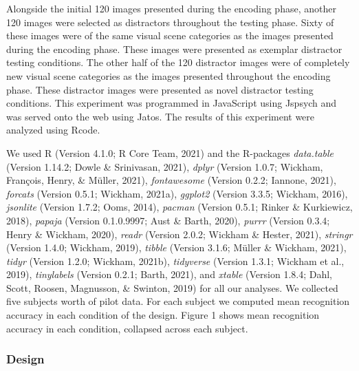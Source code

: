 \documentclass[
  man,floatsintext]{apa6}
\begin{document}
Alongside the initial 120 images presented during the encoding phase, another 120 images were selected as distractors throughout the testing phase. Sixty of these images were of the same visual scene categories as the images presented during the encoding phase. These images were presented as exemplar distractor testing conditions. The other half of the 120 distractor images were of completely new visual scene categories as the images presented throughout the encoding phase. These distractor images were presented as novel distractor testing conditions. This experiment was programmed in JavaScript using Jspsych and was served onto the web using Jatos. The results of this experiment were analyzed using Rcode.

We used R (Version 4.1.0; R Core Team, 2021) and the R-packages \emph{data.table} (Version 1.14.2; Dowle \& Srinivasan, 2021), \emph{dplyr} (Version 1.0.7; Wickham, François, Henry, \& Müller, 2021), \emph{fontawesome} (Version 0.2.2; Iannone, 2021), \emph{forcats} (Version 0.5.1; Wickham, 2021a), \emph{ggplot2} (Version 3.3.5; Wickham, 2016), \emph{jsonlite} (Version 1.7.2; Ooms, 2014), \emph{pacman} (Version 0.5.1; Rinker \& Kurkiewicz, 2018), \emph{papaja} (Version 0.1.0.9997; Aust \& Barth, 2020), \emph{purrr} (Version 0.3.4; Henry \& Wickham, 2020), \emph{readr} (Version 2.0.2; Wickham \& Hester, 2021), \emph{stringr} (Version 1.4.0; Wickham, 2019), \emph{tibble} (Version 3.1.6; Müller \& Wickham, 2021), \emph{tidyr} (Version 1.2.0; Wickham, 2021b), \emph{tidyverse} (Version 1.3.1; Wickham et al., 2019), \emph{tinylabels} (Version 0.2.1; Barth, 2021), and \emph{xtable} (Version 1.8.4; Dahl, Scott, Roosen, Magnusson, \& Swinton, 2019) for all our analyses. We collected five subjects worth of pilot data. For each subject we computed mean recognition accuracy in each condition of the design. Figure 1 shows mean recognition accuracy in each condition, collapsed across each subject.

\hypertarget{design}{%
\subsubsection{Design}\label{design}}
\end{document}

